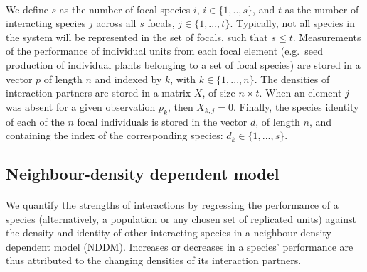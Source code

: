 \documentclass[a4,12pt]{article}
\begin{document}
\begin{refsection}
    \paragraph{}
    We define $s$ as the number of focal species $i$, $i \in \{ 1, .., s \}$, and $t$ as the number of interacting species $j$ across all $s$ focals, $j \in \{1, ..., t \}$. Typically, not all species in the system will be represented in the set of focals, such that $s \le t$. Measurements of the performance of individual units from each focal element (e.g.\ seed production of individual plants belonging to a set of focal species) are stored in a vector $p$ of length $n$ and indexed by $k$, with $k \in \{1, ..., n \}$. The densities of interaction partners are stored in a matrix $X$, of size $n \times t$. When an element $j$ was absent for a given observation $p_k$, then $X_{k,j} = 0$. Finally, the species identity of each of the $n$ focal individuals is stored in the vector $d$, of length $n$, and containing the index of the corresponding species: $d_k \in \{1, ..., s \}$.

    \subsection{Neighbour-density dependent model}
    \label{meth:nddm}    

        \paragraph{}
        We quantify the strengths of interactions by regressing the performance of a species (alternatively, a population or any chosen set of replicated units) against the density and identity of other interacting species in a neighbour-density dependent model (NDDM). Increases or decreases in a species' performance are thus attributed to the changing densities of its interaction partners. 


\end{refsection}
\end{document}

